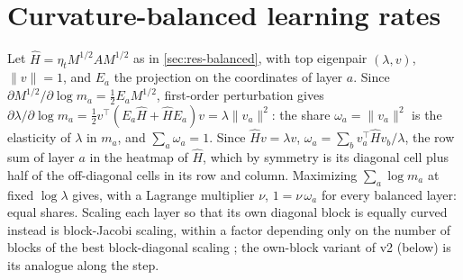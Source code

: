 \documentclass[10pt]{article}
\makeatletter
\renewcommand\paragraph{\@startsection{paragraph}{4}{\z@}{1.2ex \@plus .4ex \@minus .2ex}{-1em}{\normalfont\normalsize\bfseries}}
\newcommand{\extra}{\textsuperscript{\dag}}  %
\makeatother
\begin{document}
\clearpage
\section{Curvature-balanced learning rates\extra}
\label{app:balanced}

\paragraph{Shares.} Let $\hat H=\eta_tM^{1/2}AM^{1/2}$ as in \cref{sec:res-balanced}, with top eigenpair
$(\lambda,v)$, $\|v\|=1$, and $E_a$ the projection on the coordinates of layer $a$. Since $\partial
M^{1/2}/\partial\log m_a=\frac12E_aM^{1/2}$, first-order perturbation gives $\partial\lambda/\partial\log
m_a=\frac12v^\top(E_a\hat H+\hat HE_a)v=\lambda\|v_a\|^2$: the share $\omega_a=\|v_a\|^2$ is the elasticity of
$\lambda$ in $m_a$, and $\sum_a\omega_a=1$. Since $\hat Hv=\lambda v$, $\omega_a=\sum_bv_a^\top\hat Hv_b/\lambda$, the
row sum of layer $a$ in the heatmap of $\hat H$, which by symmetry is its diagonal cell plus half of the off-diagonal
cells in its row and column. Maximizing $\sum_a\log m_a$ at fixed $\log\lambda$ gives, with a Lagrange multiplier
$\nu$, $1=\nu\,\omega_a$ for every balanced layer: equal shares. Scaling each layer so that its own diagonal block is
equally curved instead is block-Jacobi scaling, within a factor depending only on the number of blocks of the best
block-diagonal scaling \citep{vandersluis1969,demmel2023bjacobi}; the own-block variant of v2 (below) is its analogue
along the step.
\end{document}
